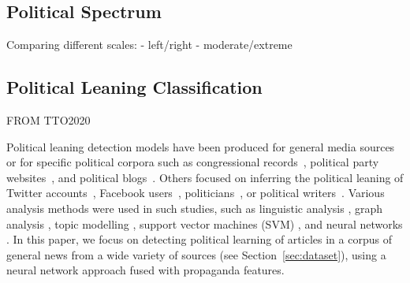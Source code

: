 \subsection{Political Spectrum}

Comparing different scales:
- left/right
- moderate/extreme

\subsection{Political Leaning Classification}
\label{ssec:lit_leaning_classification}

FROM TTO2020



Political leaning detection models have been produced for general media sources~\cite{budak} or for 
specific political corpora such as congressional records~\cite{gentzkow}, political party websites~\cite{yan2017perils}, and political blogs~\cite{ahmed201}.  
Others focused on inferring the political leaning of Twitter accounts~\cite{Cohen2013ClassifyingPO}, Facebook users~\cite{Bakshy1130}, politicians~\cite{thomas-etal-2006-get}, or political writers~\cite{iyyer-etal-2014-political}. 
Various analysis methods were used in such studies, such as linguistic analysis \cite{gentzkow}, graph analysis \cite{chen2017opinion}, topic modelling \cite{ahmed201, Cohen2013ClassifyingPO}, support vector machines (SVM) \cite{Bakshy1130,thomas-etal-2006-get}, and neural networks \cite{iyyer-etal-2014-political,baly2020we}. In this paper, we focus on detecting political learning of articles in a corpus of general news from a wide variety of sources (see Section~\ref{sec:dataset}), using a neural network approach fused with propaganda features. %



